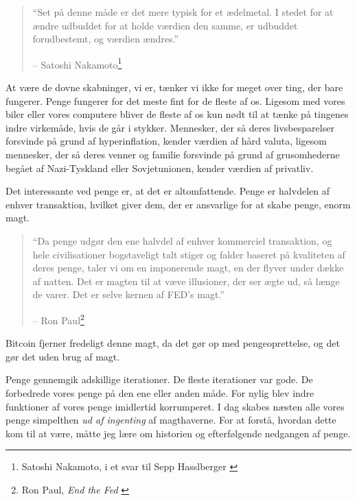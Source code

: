\begin{quotation}\begin{samepage}
\enquote{Set på denne måde er det mere typisk for et ædelmetal. I stedet for 
at ændre udbuddet for at holde værdien den samme, er udbuddet forudbestemt, 
og værdien ændres.}
\begin{flushright} -- Satoshi Nakamoto\footnote{Satoshi Nakamoto, i et svar 
    til Sepp
Hasslberger \cite{satoshi-precious-metal}}
\end{flushright}\end{samepage}\end{quotation}

At være de dovne skabninger, vi er, tænker vi ikke for meget over ting, der 
bare fungerer. Penge fungerer for det meste fint for de fleste af os. Ligesom 
med vores biler eller vores computere bliver de fleste af os kun nødt til at 
tænke på tingenes indre virkemåde, hvis de går i stykker. Mennesker, der så 
deres livsbesparelser forsvinde på grund af hyperinflation, kender værdien 
af hård valuta, ligesom mennesker, der så deres venner og familie forsvinde 
på grund af grusomhederne begået af Nazi-Tyskland eller Sovjetunionen, kender 
værdien af privatliv.

Det interessante ved penge er, at det er altomfattende. Penge er halvdelen af 
enhver transaktion, hvilket giver dem, der er ansvarlige for at skabe penge, 
enorm magt.

\begin{quotation}\begin{samepage}
\enquote{Da penge udgør den ene halvdel af enhver kommerciel transaktion, og 
hele civilisationer bogstaveligt talt stiger og falder baseret på kvaliteten 
af deres penge, taler vi om en imponerende magt, en der flyver under dække af 
natten. Det er magten til at væve illusioner, der ser ægte ud, så længe de 
varer. Det er selve kernen af FED's magt.}
\begin{flushright} -- Ron Paul\footnote{Ron Paul, 
    \textit{End the Fed} \cite{end-the-fed}}
\end{flushright}\end{samepage}\end{quotation}

Bitcoin fjerner fredeligt denne magt, da det gør op med pengeoprettelse, og 
det gør det uden brug af magt.

Penge gennemgik adskillige iterationer. De fleste iterationer var gode. De 
forbedrede vores penge på den ene eller anden måde. For nylig blev indre 
funktioner af vores penge imidlertid korrumperet. I dag skabes næsten alle 
vores penge simpelthen \textit{ud af ingenting} af magthaverne. For at forstå, 
hvordan dette kom til at være, måtte jeg lære om historien og efterfølgende 
nedgangen af penge.

